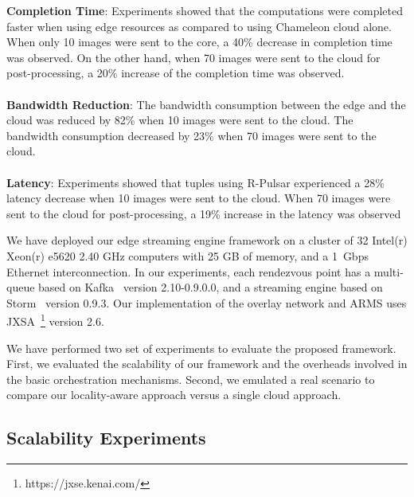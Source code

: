
\noindent\textbf{Completion Time}: Experiments showed that the computations were completed faster when using edge resources as compared to using Chameleon cloud alone. When only 10 images were sent to the core, a 40\% decrease in completion time was observed. On the other hand, when 70 images were sent to the cloud for post-processing, a 20\% increase of the completion time was observed.
\\\\
\textbf{Bandwidth Reduction}: The bandwidth consumption between the edge and the cloud was reduced by 82\% when 10 images were sent to the cloud. The bandwidth consumption decreased by 23\% when 70 images were sent to the cloud.
\\\\
\textbf{Latency}: Experiments showed that tuples using R-Pulsar experienced a 28\% latency decrease when 10 images were sent to the cloud. When 70 images were sent to the cloud for post-processing, a 19\% increase in the latency was observed














We have deployed our edge streaming engine framework on a cluster of 32 Intel(r) Xeon(r) e5620 2.40 GHz computers with 25 GB of memory, and a 1~Gbps Ethernet interconnection. In our experiments, each rendezvous point has a multi-queue based on Kafka~\cite{kafka} version 2.10-0.9.0.0, and a streaming engine based on Storm~\cite{storm} version 0.9.3. Our implementation of the overlay network and ARMS uses JXSA~\footnote{https://jxse.kenai.com/} version 2.6.

We have performed two set of experiments to evaluate the proposed framework. First, we evaluated the scalability of our framework and the overheads involved in the basic orchestration mechanisms. Second, we emulated a real scenario to compare our locality-aware approach versus a single cloud approach.

\subsection{Scalability Experiments}

